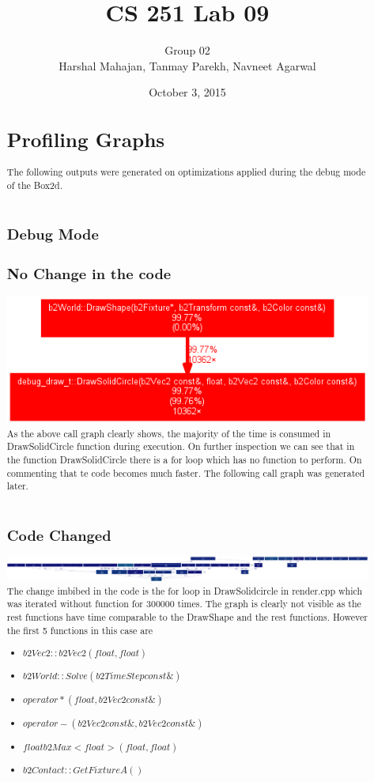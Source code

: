 \documentclass[]{report}
\title{CS 251 Lab 09}
\author{Group 02\\ Harshal Mahajan, Tanmay Parekh, Navneet Agarwal}
\date{October 3, 2015}
\begin{document}
\maketitle

\begin{abstract}
\section*{Profiling Graphs}
The following outputs were generated on optimizations applied during the debug mode of the Box2d.
\\ \\
\subsection{Debug Mode}
\subsection*{No Change in the code}
\includegraphics[width=1\textwidth]{callgraph1.png}
As the above call graph clearly shows, the majority of the time is consumed in DrawSolidCircle function during execution. On further inspection we can see that in the function DrawSolidCircle there is a for loop which has no function to perform.
On commenting that te code becomes much faster. The following call graph was generated later.
\\ \\
\subsection*{Code Changed}
\includegraphics[width=1\textwidth]{callgraph.png}
The change imbibed in the code is the for loop in DrawSolidcircle in render.cpp which was iterated without function for 300000 times. The graph is clearly not visible as the rest functions have time comparable to the DrawShape and the rest functions. However the first 5 functions in this case are
\begin{itemize}
\item $b2Vec2::b2Vec2(float, float)$
\item $b2World::Solve(b2TimeStep const\&)$
\item $operator*(float, b2Vec2 const\&)$
\item $operator-(b2Vec2 const\&, b2Vec2 const\&)$
\item $float b2Max<float>(float, float)$
\item $b2Contact::GetFixtureA()$
\end{itemize}
\newpage

\end{abstract}
\end{document}
